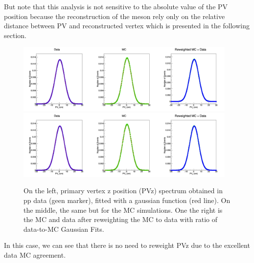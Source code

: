 
But note that this analysis is not sensitive to the absolute value of the PV position because the reconstruction of the \Bs meson rely only on the relative distance between PV and \Bs reconstructed vertex which is presented in the following section.

\begin{figure}[h]
\begin{center}
\includegraphics[width= 0.97\textwidth]{Plots/MCReweight/PVz/BPPVZMCData.png}
\includegraphics[width= 0.97\textwidth]{Plots/MCReweight/PVz/BsPVZMCData.png}
\caption{ 
On the left, \PBzs primary vertex z position (PVz) spectrum obtained in pp data (geen marker), fitted with a gaussian function (red line). On the middle, the same but for the MC simulations. One the right is the MC and data after reweighting the MC to data with ratio of data-to-MC Gaussian Fits. 
}
\label{fig:datamc-pvz-pp}
\end{center}
\end{figure}

\clearpage

In this case, we can see that there is no need to reweight PVz due to the excellent data MC agreement.
\clearpage

